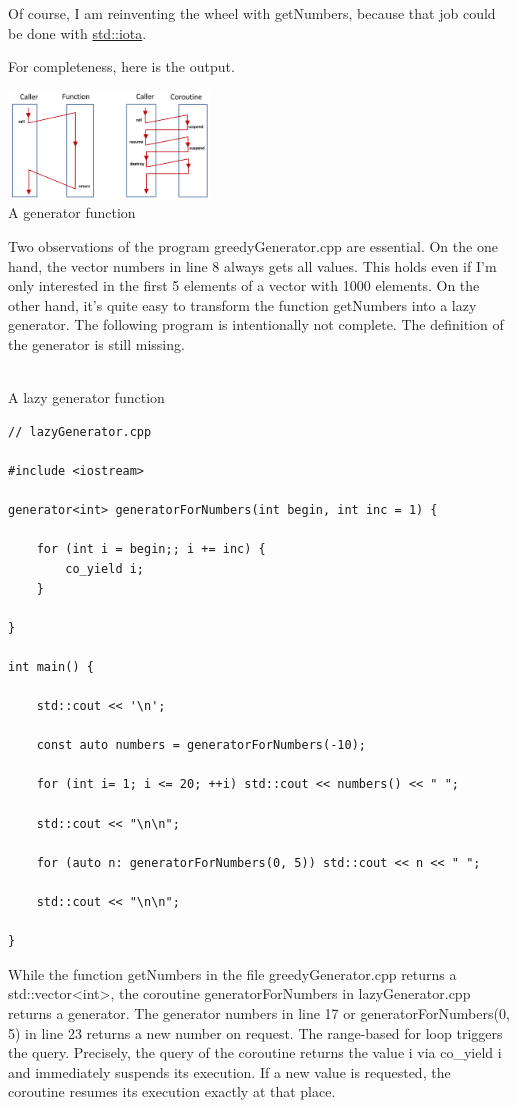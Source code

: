 Of course, I am reinventing the wheel with getNumbers, because that job could be done with \href{http://en.cppreference.com/w/cpp/algorithm/iota}{std::iota}.

For completeness, here is the output.

\begin{center}
\includegraphics[width=0.4\textwidth]{content/3/chapter6/images/3.png}\\
A generator function
\end{center}

Two observations of the program greedyGenerator.cpp are essential. On the one hand, the vector numbers in line 8 always gets all values. This holds even if I’m only interested in the first 5 elements of a vector with 1000 elements. On the other hand, it’s quite easy to transform the function getNumbers into a lazy generator. The following program is intentionally not complete. The definition of the generator is still missing.

\hspace*{\fill} \\ %
\noindent
A lazy generator function
\begin{lstlisting}[style=styleCXX]
// lazyGenerator.cpp

#include <iostream>

generator<int> generatorForNumbers(int begin, int inc = 1) {

	for (int i = begin;; i += inc) {
		co_yield i;
	}

}

int main() {

	std::cout << '\n';
	
	const auto numbers = generatorForNumbers(-10);
	
	for (int i= 1; i <= 20; ++i) std::cout << numbers() << " ";
	
	std::cout << "\n\n";
	
	for (auto n: generatorForNumbers(0, 5)) std::cout << n << " ";
	
	std::cout << "\n\n";

}
\end{lstlisting}

While the function getNumbers in the file greedyGenerator.cpp returns a std::vector<int>, the coroutine generatorForNumbers in lazyGenerator.cpp returns a generator. The generator numbers in line 17 or generatorForNumbers(0, 5) in line 23 returns a new number on request. The range-based for loop triggers the query. Precisely, the query of the coroutine returns the value i via co\_yield i and immediately suspends its execution. If a new value is requested, the coroutine resumes its execution exactly at that place.

